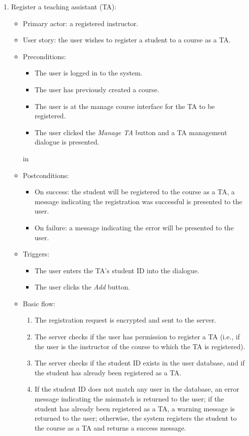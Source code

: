 \begin{enumerate}
\item Register a teaching assistant (TA):
\begin{itemize}
    \item Primary actor: a registered instructor.
    \item User story: the user wishes to register a student to a course as a
        TA.
    \item Preconditions:
        \begin{itemize}
            \item The user is logged in to the system.
            \item The user has previously created a course.
            \item The user is at the manage course interface for the TA
                to be registered.
            \item The user clicked the \emph{Manage TA} button and a TA
                management dialogue is presented.
        \end{itemize}
         in
    \item Postconditions:
        \begin{itemize}
            \item On success: the student will be registered to the course
                as a TA, a message indicating the registration was
                successful is presented to the user.
            \item On failure: a message indicating the error will be presented
                to the user.
        \end{itemize}
    \item Triggers:
        \begin{itemize}
            \item The user enters the TA's student ID into the dialogue.
            \item The user clicks the \emph{Add} button.
        \end{itemize}
    \item Basic flow:
        \begin{enumerate}
            \item The registration request is encrypted and sent to the server.
            \item The server checks if the user has permission to register a
                TA (i.e., if the user is the instructor of the course to which
                the TA is registered).
            \item The server checks if the student ID exists in the user
                database, and if the student has already been registered as a TA.
            \item If the student ID does not match any user in the database, 
                an error message indicating the mismatch is returned to the
                user;
                if the student has already been registered as a TA, a warning
                message is returned to the user; otherwise, the system registers
                the student to the course as a TA and returns a success message.
        \end{enumerate}
\end{itemize}


\end{enumerate}
